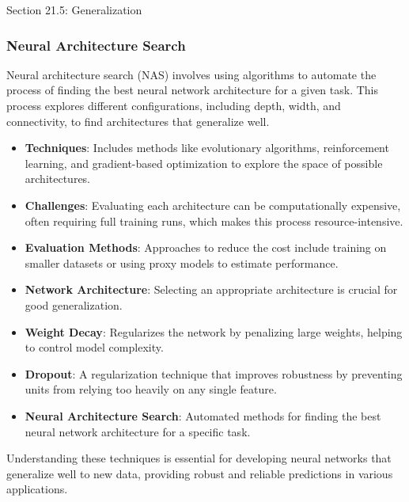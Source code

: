 \begin{notes}{Section 21.5: Generalization}
\begin{highlight}[Dropout]
    \end{highlight}
    
    \subsubsection*{Neural Architecture Search}
    
    Neural architecture search (NAS) involves using algorithms to automate the process of finding the best neural network architecture for a given task. This process explores different configurations, 
    including depth, width, and connectivity, to find architectures that generalize well.
    
    \begin{highlight}
    
        \begin{itemize}
            \item \textbf{Techniques}: Includes methods like evolutionary algorithms, reinforcement learning, and gradient-based optimization to explore the space of possible architectures.
            \item \textbf{Challenges}: Evaluating each architecture can be computationally expensive, often requiring full training runs, which makes this process resource-intensive.
            \item \textbf{Evaluation Methods}: Approaches to reduce the cost include training on smaller datasets or using proxy models to estimate performance.
        \end{itemize}
    
    \end{highlight}
    
    \begin{highlight}
    
        \begin{itemize}
            \item \textbf{Network Architecture}: Selecting an appropriate architecture is crucial for good generalization.
            \item \textbf{Weight Decay}: Regularizes the network by penalizing large weights, helping to control model complexity.
            \item \textbf{Dropout}: A regularization technique that improves robustness by preventing units from relying too heavily on any single feature.
            \item \textbf{Neural Architecture Search}: Automated methods for finding the best neural network architecture for a specific task.
        \end{itemize}
    
        Understanding these techniques is essential for developing neural networks that generalize well to new data, providing robust and reliable predictions in various applications.
    
    \end{highlight}
\end{notes}

